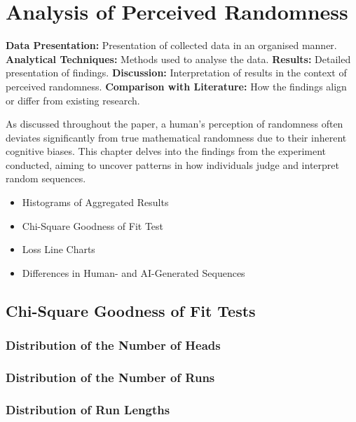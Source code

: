 \section{Analysis of Perceived Randomness}\label{section:analysis_of_perceived_randomness}
\textbf{Data Presentation:} Presentation of collected data in an organised manner.\newline
\textbf{Analytical Techniques:} Methods used to analyse the data.\newline
\textbf{Results:} Detailed presentation of findings.\newline
\textbf{Discussion:} Interpretation of results in the context of perceived randomness.\newline
\textbf{Comparison with Literature:} How the findings align or differ from existing research.\newline

As discussed throughout the paper, a human's perception of randomness often deviates significantly from true mathematical randomness due to their inherent cognitive biases. This chapter delves into the findings from the experiment conducted, aiming to uncover patterns in how individuals judge and interpret random sequences.

\begin{itemize}
    \item Histograms of Aggregated Results
    \item Chi-Square Goodness of Fit Test
    \item Loss Line Charts
    \item Differences in Human- and AI-Generated Sequences
\end{itemize}

\subsection{Chi-Square Goodness of Fit Tests}

\subsubsection{Distribution of the Number of Heads}

\subsubsection{Distribution of the Number of Runs}

\subsubsection{Distribution of Run Lengths}

